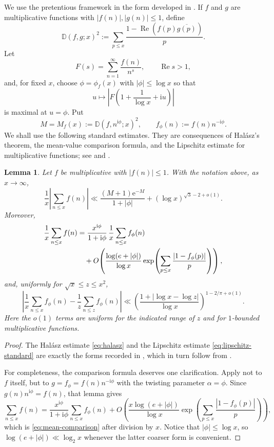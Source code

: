 \documentclass[12pt,reqno]{amsart}
\newtheorem{lemma}[theorem]{Lemma}
\theoremstyle{remark}
\numberwithin{equation}{section}
\newcommand{\D}{\mathbb D}
\newcommand{\Ree}{\operatorname{Re}}
\newcommand{\e}{\mathrm e}
\newcommand{\ii}{\mathrm i}
\newcommand{\logtwo}{\log_2}
\begin{document}
We use the pretentious framework in the form developed in \cite{GS03,GS18}.  If $f$ and $g$ are multiplicative functions with $|f(n)|,|g(n)|\le1$, define
\[
\D(f,g;x)^2
:=\sum_{p\le x}\frac{1-\Ree(f(p)\overline{g(p)})}{p}.
\]
Let
\[
F(s)=\sum_{n=1}^{\infty}\frac{f(n)}{n^s},
\qquad \Ree s>1,
\]
and, for fixed $x$, choose $\phi=\phi_f(x)$ with $|\phi|\le\log x$ so that
\[
u\mapsto \left|F\left(1+\frac1{\log x}+\ii u\right)\right|
\]
is maximal at $u=\phi$.  Put
\[
M=M_f(x):=\D(f,n^{\ii\phi};x)^2,
\qquad
f_\phi(n):=f(n)n^{-\ii\phi}.
\]
We shall use the following standard estimates.  They are consequences of Hal\'asz's theorem, the mean-value comparison formula, and the Lipschitz estimate for multiplicative functions; see \cite[Section 2]{GS18} and \cite{GS03}.

\begin{lemma}\label{lem:standard-mean}
Let $f$ be multiplicative with $|f(n)|\le1$.  With the notation above, as $x\to\infty$,
\begin{equation}\label{eq:halasz}
\frac1x\left|\sum_{n\le x}f(n)\right|
\ll
\frac{(M+1)\e^{-M}}{1+|\phi|}
+(\log x)^{\sqrt3-2+o(1)}.
\end{equation}
Moreover,
\begin{align}
\frac1x\sum_{n\le x}f(n)
&=\frac{x^{\ii\phi}}{1+\ii\phi}\,
\frac1x\sum_{n\le x}f_\phi(n) \notag\\
&\quad+O\!\left(
\frac{\log(e+|\phi|)}{\log x}
\exp\!\left(\sum_{p\le x}\frac{|1-f_\phi(p)|}{p}\right)
\right),
\label{eq:mean-comparison}
\end{align}
and, uniformly for $\sqrt x\le z\le x^2$,
\begin{equation}\label{eq:lipschitz-standard}
\left|
\frac1x\sum_{n\le x}f_\phi(n)
-
\frac1z\sum_{n\le z}f_\phi(n)
\right|
\ll
\left(\frac{1+|\log x-\log z|}{\log x}\right)^{1-2/\pi+o(1)}.
\end{equation}
Here the $o(1)$ terms are uniform for the indicated range of $z$ and for $1$-bounded multiplicative functions.
\end{lemma}

\begin{proof}
The Hal\'asz estimate \eqref{eq:halasz} and the Lipschitz estimate
\eqref{eq:lipschitz-standard} are exactly the forms recorded in
\cite[Section~2, (2.3) and (2.5)]{GS18}, which in turn follow from
\cite[Theorems~2b and~4]{GS03}.

For completeness, the comparison formula deserves one clarification.  Apply
\cite[Lemma~7.1]{GS03} not to $f$ itself, but to
$g=f_\phi=f(n)n^{-\ii\phi}$ with the twisting parameter $\alpha=\phi$.
Since $g(n)n^{\ii\phi}=f(n)$, that lemma gives
\[
\sum_{n\le x}f(n)
=\frac{x^{\ii\phi}}{1+\ii\phi}\sum_{n\le x}f_\phi(n)
+O\!\left(
\frac{x\log(e+|\phi|)}{\log x}
\exp\!\left(\sum_{p\le x}\frac{|1-f_\phi(p)|}{p}\right)
\right),
\]
which is \eqref{eq:mean-comparison} after division by $x$.  Notice that
$|\phi|\le\log x$, so $\log(e+|\phi|)\ll\logtwo x$ whenever the latter
coarser form is convenient.
\end{proof}
\end{document}
